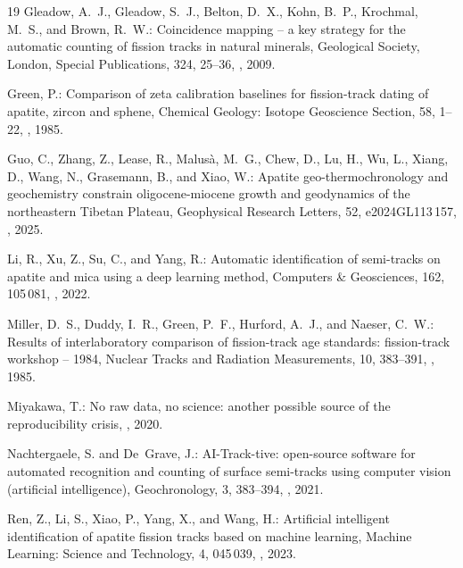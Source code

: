 \documentclass[gchron, manuscript]{copernicus}
\begin{document}
\begin{thebibliography}{19}
Gleadow, A.~J., Gleadow, S.~J., Belton, D.~X., Kohn, B.~P., Krochmal, M.~S.,
  and Brown, R.~W.: Coincidence mapping -- a key strategy for the automatic
  counting of fission tracks in natural minerals, Geological Society, London,
  Special Publications, 324, 25--36, , 2009.

Green, P.: Comparison of zeta calibration baselines for fission-track dating of
  apatite, zircon and sphene, Chemical Geology: Isotope Geoscience Section, 58,
  1--22, , 1985.

Guo, C., Zhang, Z., Lease, R., Malus{\`a}, M.~G., Chew, D., Lu, H., Wu, L.,
  Xiang, D., Wang, N., Grasemann, B., and Xiao, W.: {Apatite
  geo-thermochronology and geochemistry constrain oligocene-miocene growth and
  geodynamics of the northeastern Tibetan Plateau}, Geophysical Research
  Letters, 52, e2024GL113\,157, ,
  2025.

Li, R., Xu, Z., Su, C., and Yang, R.: Automatic identification of semi-tracks
  on apatite and mica using a deep learning method, Computers \& Geosciences,
  162, 105\,081, , 2022.

Miller, D.~S., Duddy, I.~R., Green, P.~F., Hurford, A.~J., and Naeser, C.~W.:
  Results of interlaboratory comparison of fission-track age standards:
  fission-track workshop -- 1984, Nuclear Tracks and Radiation Measurements,
  10, 383--391, , 1985.

Miyakawa, T.: No raw data, no science: another possible source of the
  reproducibility crisis, , 2020.

Nachtergaele, S. and De~Grave, J.: {AI-Track-tive: open-source software for
  automated recognition and counting of surface semi-tracks using computer
  vision (artificial intelligence)}, Geochronology, 3, 383--394,
  , 2021.

Ren, Z., Li, S., Xiao, P., Yang, X., and Wang, H.: Artificial intelligent
  identification of apatite fission tracks based on machine learning, Machine
  Learning: Science and Technology, 4, 045\,039,
  , 2023.


\end{thebibliography}
\end{document}
